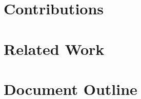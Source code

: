 \section{Contributions}\label{Contributions}

\section{Related Work}\label{Related Work}

\section{Document Outline}\label{Document Outline}
